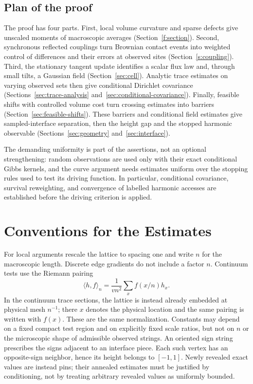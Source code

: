 \documentclass[11pt]{article}
\theoremstyle{definition}
\theoremstyle{remark}
\numberwithin{equation}{section}
\begin{document}
\subsection{Plan of the proof}
The proof has four parts. First, local volume curvature and sparse
defects give unscaled moments of macroscopic averages
(Section~\ref{f:section}). Second, synchronous
reflected couplings turn Brownian contact events into weighted control of
differences and their errors at observed sites
(Section~\ref{s:coupling}). Third, the stationary
tangent update identifies a scalar flux law and, through small tilts, a
Gaussian field (Section~\ref{sec:cell}). Analytic trace estimates on
varying observed sets then give conditional Dirichlet covariance
(Sections~\ref{sec:trace-analysis} and~\ref{sec:conditional-covariance}).
Finally, feasible shifts with controlled volume cost turn crossing
estimates into barriers (Section~\ref{sec:feasible-shifts}). These
barriers and conditional field estimates give sampled-interface separation,
then the height gap and the stopped harmonic observable
(Sections~\ref{sec:geometry} and~\ref{sec:interface}).

The demanding uniformity is part of the assertions, not an optional
strengthening: random observations are used only with their exact conditional
Gibbs kernels, and the curve argument needs estimates uniform over the
stopping rules used to test its driving function. In particular,
conditional covariance, survival reweighting, and convergence of labelled
harmonic accesses are established before the driving criterion is applied.

\section{Conventions for the Estimates}\label{sec:conventions}
For local arguments rescale the lattice to spacing one and write $n$ for
the macroscopic length. Discrete edge gradients do not include a factor
$n$. Continuum tests use the Riemann pairing
\[
\langle h,f\rangle_n=\frac1{vn^2}\sum_x f(x/n)h_x.
\]
In the continuum trace sections, the lattice is instead already embedded
at physical mesh $n^{-1}$; there $x$ denotes the physical location and the
same pairing is written with $f(x)$. These are the same normalization.
Constants may depend on a fixed compact test region and on explicitly fixed
scale ratios, but not on $n$ or the microscopic shape of admissible observed
strings. An oriented sign string prescribes the signs adjacent to an
interface piece. Each such vertex has an opposite-sign neighbor, hence its
height belongs to $[-1,1]$. Newly revealed exact values are instead pins;
their annealed estimates must be justified by conditioning, not by treating
arbitrary revealed values as uniformly bounded.
\end{document}
